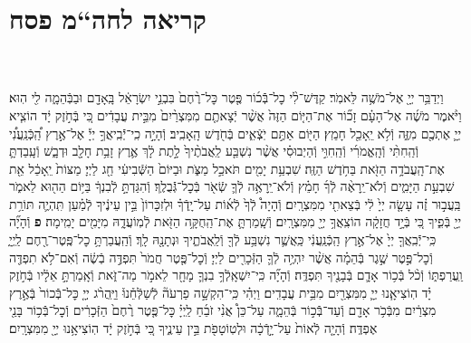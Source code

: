 \documentclass[twoside, openany, parskip=half, 11pt]{book}
\begin{document}
\begin{footnotesize}
\begin{multicols}{2}
\end{multicols}

\section[חה“מ פסח]{קריאה לחה“מ פסח}


\begin{multicols}{2}

\\ \\
וַיְדַבֵּ֥ר יְיָ֖ אֶל־מֹשֶׁ֥ה לֵּאמֹֽר׃ קַדֶּשׁ־לִ֨י כׇל־בְּֿֿכ֜וֹר פֶּ֤טֶר כׇּל־רֶ֨חֶם֙ בִּבְנֵ֣י יִשְׂרָאֵ֔ל בָּֽאָדָ֖ם וּבַבְּֿהֵמָ֑ה לִ֖י הֽוּא׃ וַיֹּ֨אמֶר מֹשֶׁ֜ה אֶל־הָעָ֗ם זָכ֞וֹר אֶת־הַיּ֤וֹם הַזֶּה֙ אֲשֶׁ֨ר יְֿצָאתֶ֤ם מִמִּצְרַ֨יִם֙ מִבֵּ֣ית עֲבָדִ֔ים כִּ֚י בְּֿחֹ֣זֶק יָ֔ד הוֹצִ֧יא יְיָ֛ אֶתְכֶ֖ם מִזֶּ֑ה וְֿלֹ֥א יֵֽאָכֵ֖ל חָמֵֽץ׃ הַיּ֖וֹם אַתֶּ֣ם יֹֽצְֿאִ֑ים בְּֿחֹ֖דֶשׁ הָֽאָבִֽיב׃
וְֿהָיָ֣ה כִֽי־יְֿֿבִֽיאֲךָ֣ יְיָ֡ אֶל־אֶ֣רֶץ הַֽ֠כְּֿנַֽעֲנִ֠י וְֿהַֽחִתִּ֨י וְֿהָֽאֱמֹרִ֜י וְֿהַֽחִוִּ֣י וְֿהַיְבוּסִ֗י אֲשֶׁ֨ר נִשְׁבַּ֤ע לַֽאֲבֹתֶ֨יךָ֙ לָ֣תֶת לָ֔ךְ אֶ֛רֶץ זָבַ֥ת חָלָ֖ב וּדְבָ֑שׁ וְֿעָֽבַדְתָּ֛ אֶת־הָֽעֲבֹדָ֥ה הַזֹּ֖את בַּחֹ֥דֶשׁ הַזֶּֽה׃ שִׁבְעַ֥ת יָמִ֖ים תֹּאכַ֣ל מַצֹּ֑ת וּבַיּוֹם֙ הַשְּֿׁבִיעִ֔י חַ֖ג לַיְיָ׃ מַצּוֹת֙ יֵֽאָכֵ֔ל אֵ֖ת שִׁבְעַ֣ת הַיָּמִ֑ים וְֿלֹא־יֵֽרָאֶ֨ה לְֿךָ֜ חָמֵ֗ץ וְֿלֹא־יֵֽרָאֶ֥ה לְֿךָ֛ שְֿׂאֹ֖ר בְּֿכׇל־גְּֿֿבֻלֶֽךָ׃ וְֿהִגַּדְתָּ֣ לְֿבִנְךָ֔ בַּיּ֥וֹם הַה֖וּא לֵאמֹ֑ר בַּֽעֲב֣וּר זֶ֗ה עָשָׂ֤ה יְיָ֙ לִ֔י בְּֿצֵאתִ֖י מִמִּצְרָֽיִם׃ וְֿהָיָה֩ לְֿךָ֙ לְֿא֜וֹת עַל־יָֽדְֿךָ֗ וּלְזִכָּרוֹן֙ בֵּ֣ין עֵינֶ֔יךָ לְֿמַ֗עַן תִּֽהְיֶ֛ה תּוֹרַ֥ת יְיָ֖ בְּֿפִ֑יךָ כִּ֚י בְּֿיָ֣ד חֲזָקָ֔ה הוֹצִֽאֲךָ֥ יְיָ֖ מִמִּצְרָֽיִם׃ וְֿשָֽׁמַרְתָּ֛ אֶת־הַֽחֻקָּ֥ה הַזֹּ֖את לְֿמֽוֹעֲדָ֑הּ מִיָּמִ֖ים יָמִֽימָה׃ \textbf{פ}
וְֿהָיָ֞ה כִּֽי־יְֿֿבִֽאֲךָ֤ יְיָ֙ אֶל־אֶ֣רֶץ הַֽכְּֿנַֽעֲנִ֔י כַּֽאֲשֶׁ֛ר נִשְׁבַּ֥ע לְֿךָ֖ וְֿלַֽאֲבֹתֶ֑יךָ וּנְתָנָ֖הּ לָֽךְ׃ וְֿהַֽעֲבַרְתָּ֥ כׇל־פֶּֽטֶר־רֶ֖חֶם לַֽיְיָ֑ וְֿכׇל־פֶּ֣טֶר שֶׁ֣גֶר בְּֿהֵמָ֗ה אֲשֶׁ֨ר יִהְיֶ֥ה לְֿךָ֛ הַזְּֿכָרִ֖ים לַיְיָ׃ וְֿכׇל־פֶּ֤טֶר חֲמֹר֙ תִּפְדֶּ֣ה בְֿשֶׂ֔ה וְֿאִם־לֹ֥א תִפְדֶּ֖ה וַֽעֲרַפְתּ֑וֹ וְֿכֹ֨ל בְּֿכ֥וֹר אָדָ֛ם בְּֿבָנֶ֖יךָ תִּפְדֶּֽה׃ וְֿהָיָ֞ה כִּֽי־יִשְׁאָֽלְֿךָ֥ בִנְךָ֛ מָחָ֖ר לֵאמֹ֣ר מַה־זֹּ֑את וְֿאָֽמַרְתָּ֣ אֵלָ֔יו בְּֿחֹ֣זֶק יָ֗ד הֽוֹצִיאָ֧נוּ יְיָ֛ מִמִּצְרַ֖יִם מִבֵּ֥ית עֲבָדִֽים׃ וַיְהִ֗י כִּֽי־הִקְשָׁ֣ה פַרְעֹה֘ לְֿשַׁלְּֿחֵ֒נוּ֒ וַיַּֽהֲרֹ֨ג יְיָ֤ כׇּל־בְּֿֿכוֹר֙ בְּֿאֶ֣רֶץ מִצְרַ֔יִם מִבְּֿכֹ֥ר אָדָ֖ם וְֿעַד־בְּֿֿכ֣וֹר בְּֿהֵמָ֑ה עַל־כֵּן֩ אֲנִ֨י זֹבֵ֜חַ לַֽיְיָ֗ כׇּל־פֶּ֤טֶר רֶ֨חֶם֙ הַזְּֿכָרִ֔ים וְֿכׇל־בְּֿֿכ֥וֹר בָּנַ֖י אֶפְדֶּֽה׃ וְֿהָיָ֤ה לְֿאוֹת֙ עַל־יָ֣דְֿכָ֔ה וּלְטֽוֹטָפֹ֖ת בֵּ֣ין עֵינֶ֑יךָ כִּ֚י בְּֿחֹ֣זֶק יָ֔ד הֽוֹצִיאָ֥נוּ יְיָ֖ מִמִּצְרָֽיִם׃



\end{multicols}
\end{footnotesize}
\end{document}
